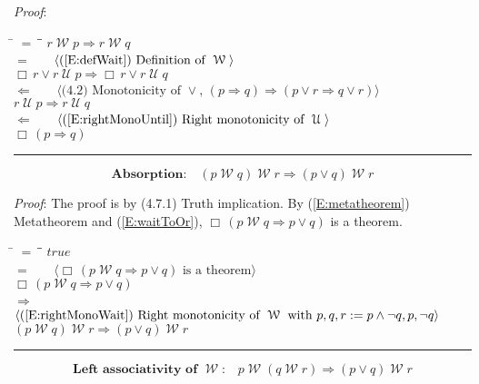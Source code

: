 \documentclass[12pt, fleqn, leqno]{article}
\newcommand{\lgap}{2pt}                             %
\newcommand{\mymathindent}{24pt}                    %
\newcommand{\impl}{\ensuremath{\Rightarrow}}        %
\newcommand{\foll}{\ensuremath{\Leftarrow}}         %
\newcommand{\Until}{\;\mathcal{U}\;}
\newcommand{\Wait}{\;\mathcal{W}\;}
\newcommand{\Always}{\Box\,}
\newcommand{\myqed}{\rule[-.23ex]{1.2ex}{2.0ex}}
\newcommand{\myqedtab}{\hspace{384pt}}              %
\newcommand{\Gll} {\langle}                         %
\newcommand{\Ggg} {\rangle}                         %
\newcommand{\Hint}[1]     {\ \ \ $\Gll              \mbox{#1} \Ggg$ }   %
\begin{document}
\emph{Proof}:
\begin{tabbing}
\hspace{\mymathindent} \= $= \;$ \= \myqedtab \= \kill
  \> \>   $r \Wait p \impl r \Wait q$\\[\lgap]
  \> $=$ \> \Hint{(\ref{E:defWait}) Definition of $\Wait$} \\[\lgap]
  \> \>   $\Always r \lor r \Until p \impl \Always r \lor r \Until q$\\[\lgap]
  \> $\foll$  \>  \Hint{(4.2) Monotonicity of $\lor$, $(p\impl q)\impl (p\lor r \impl q\lor r)$}\\[\lgap]
  \> \>   $r \Until p \impl r \Until q$\\[\lgap]
  \> $\foll$  \>  \Hint{(\ref{E:rightMonoUntil}) Right monotonicity of $\Until$}\\[\lgap]
  \> \>   $\Always (p \impl q)$ \quad \myqed
\end{tabbing}
\begin{equation}\label{E:waitImpAbsR}
\textbf{Absorption:}\quad (p \Wait q) \Wait r \impl (p \lor q) \Wait r
\end{equation}

\emph{Proof}: The proof is by (4.7.1) Truth implication.
By (\ref{E:metatheorem}) Metatheorem and (\ref{E:waitToOr}), $\Always (p\Wait q\impl p\lor q)$ is a theorem.
\begin{tabbing}
\hspace{\mymathindent} \= $= \;$ \= \myqedtab \= \kill
  \> \>   $true$\\[\lgap]
  \> $=$ \> \Hint{$\Always (p\Wait q\impl p\lor q)$ is a theorem} \\[\lgap]
  \> \>   $\Always (p\Wait q\impl p\lor q)$\\[\lgap]
  \> $\impl$  \>  \Hint{(\ref{E:rightMonoWait}) Right monotonicity of $\Wait$ with $p,q,r := p\land \neg q, p, \neg q$}\\[\lgap]
  \> \>   $(p \Wait q) \Wait r \impl (p \lor q) \Wait r$ \quad \myqed
\end{tabbing}
\begin{equation}\label{E:leftAssocWait}
\textbf{Left associativity of $\Wait$:}\quad p \Wait (q \Wait r) \impl (p \lor q) \Wait r
\end{equation}
\end{document}
